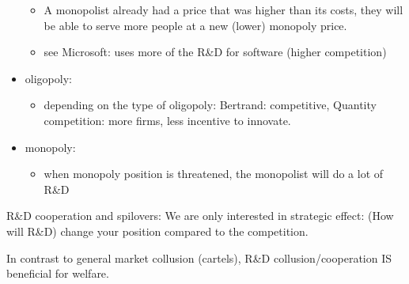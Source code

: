 \documentclass[12pt, a4paper, titlepage]{extarticle}
\begin{document}
\begin{itemize}
\begin{itemize}
        \item A monopolist already had a price that was higher than its costs, they will be able to serve more people at a new (lower) monopoly price.
        \item see Microsoft: uses more of the R\&D for software (higher competition) 
    \end{itemize}
    \item oligopoly:
    \begin{itemize}
        \item depending on the type of oligopoly: Bertrand: competitive, Quantity competition: more firms, less incentive to innovate.
    \end{itemize}
    \item monopoly:
    \begin{itemize}
        \item when monopoly position is threatened, the monopolist will do a lot of R\&D 
    \end{itemize}
\end{itemize}
R\&D cooperation and spilovers:
We are only interested in strategic effect: (How will R\&D) change your position compared to the competition.

In contrast to general market collusion (cartels), R\&D collusion/cooperation IS beneficial for welfare.
\end{document}
